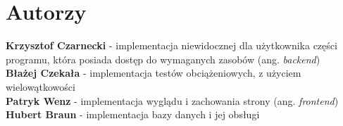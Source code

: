 \section{Autorzy}
   \large
{
\textbf{Krzysztof Czarnecki}  - implementacja niewidocznej dla użytkownika części programu, która posiada dostęp do wymaganych zasobów (ang. \textit{backend}) \\
\textbf{Błażej Czekała} - implementacja testów obciążeniowych, z użyciem wielowątkowości\\
\textbf{Patryk Wenz} - implementacja wyglądu i zachowania strony (ang. \textit{frontend})\\
\textbf{Hubert Braun} - implementacja bazy danych i jej obsługi
} 